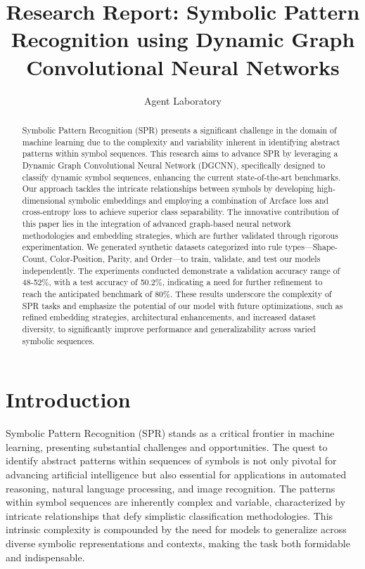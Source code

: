 \documentclass{article}
\title{Research Report: Symbolic Pattern Recognition using Dynamic Graph Convolutional Neural Networks}
\author{Agent Laboratory}
\begin{document}
\maketitle

\begin{abstract}
Symbolic Pattern Recognition (SPR) presents a significant challenge in the domain of machine learning due to the complexity and variability inherent in identifying abstract patterns within symbol sequences. This research aims to advance SPR by leveraging a Dynamic Graph Convolutional Neural Network (DGCNN), specifically designed to classify dynamic symbol sequences, enhancing the current state-of-the-art benchmarks. Our approach tackles the intricate relationships between symbols by developing high-dimensional symbolic embeddings and employing a combination of Arcface loss and cross-entropy loss to achieve superior class separability. The innovative contribution of this paper lies in the integration of advanced graph-based neural network methodologies and embedding strategies, which are further validated through rigorous experimentation. We generated synthetic datasets categorized into rule types—Shape-Count, Color-Position, Parity, and Order—to train, validate, and test our models independently. The experiments conducted demonstrate a validation accuracy range of 48-52\%, with a test accuracy of 50.2\%, indicating a need for further refinement to reach the anticipated benchmark of 80\%. These results underscore the complexity of SPR tasks and emphasize the potential of our model with future optimizations, such as refined embedding strategies, architectural enhancements, and increased dataset diversity, to significantly improve performance and generalizability across varied symbolic sequences.
\end{abstract}

\section{Introduction}
Symbolic Pattern Recognition (SPR) stands as a critical frontier in machine learning, presenting substantial challenges and opportunities. The quest to identify abstract patterns within sequences of symbols is not only pivotal for advancing artificial intelligence but also essential for applications in automated reasoning, natural language processing, and image recognition. The patterns within symbol sequences are inherently complex and variable, characterized by intricate relationships that defy simplistic classification methodologies. This intrinsic complexity is compounded by the need for models to generalize across diverse symbolic representations and contexts, making the task both formidable and indispensable.
\end{document}
